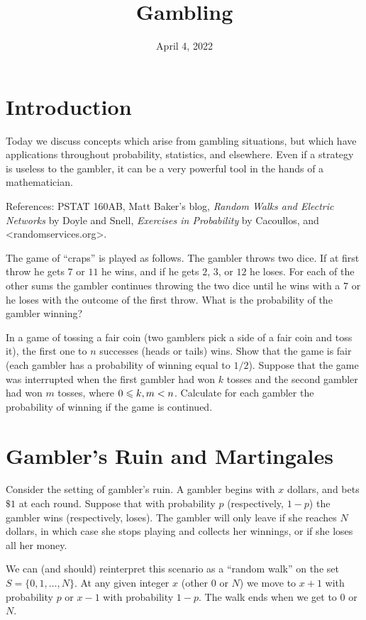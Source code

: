 \documentclass{article}
\title{Gambling}
\author{}
\date{April 4, 2022}
\begin{document}
\section{Introduction}

Today we discuss concepts which arise from gambling situations, but which have applications throughout probability, statistics, and elsewhere. Even if a strategy is useless to the gambler, it can be a very powerful tool in the hands of a mathematician.

References: PSTAT 160AB, Matt Baker's blog, \emph{Random Walks and Electric Networks} by Doyle and Snell, \emph{Exercises in Probability} by Cacoullos, and <randomservices.org>.

\begin{exercise}
The game of ``craps'' is played as follows. The gambler throws two dice. If at first throw he gets $7$ or $11$ he wins, and if he gets $2$, $3$, or $12$ he loses. For each of the other sums the gambler continues throwing the two dice until he wins with a $7$ or he loses with the outcome of the first throw. What is the probability of the gambler winning?
\end{exercise}

\begin{exercise}
In a game of tossing a fair coin (two gamblers pick a side of a fair coin and toss it), the first one to $n$ successes (heads or tails) wins. Show that the game is fair (each gambler has a probability of winning equal to $1/2$). Suppose that the game was interrupted when the first gambler had won $k$ tosses and the second gambler had won $m$ tosses, where $0\leqslant k,m<n$. Calculate for each gambler the probability of winning if the game is continued. 
\end{exercise}

\section{Gambler's Ruin and Martingales}

Consider the setting of gambler's ruin. A gambler begins with $x$ dollars, and bets $\$ 1$ at each round. Suppose that with probability $p$ (respectively, $1-p$) the gambler wins (respectively, loses). The gambler will only leave if she reaches $N$ dollars, in which case she stops playing and collects her winnings, or if she loses all her money. 

We can (and should) reinterpret this scenario as a ``random walk'' on the set $S=\{0,1,\dots,N\}$. At any given integer $x$ (other $0$ or $N$) we move to $x+1$ with probability $p$ or $x-1$ with probability $1-p$. The walk ends when we get to $0$ or $N$.
\end{document}
